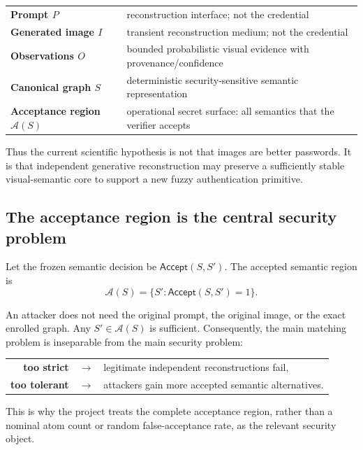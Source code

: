 \documentclass[11pt,a4paper]{article}
\newcommand{\Aset}{\mathcal{A}}
\begin{document}
\begin{center}
\begin{tabularx}{0.92\textwidth}{>{\bfseries}l X}
Prompt $P$ & reconstruction interface; not the credential \\
Generated image $I$ & transient reconstruction medium; not the credential \\
Observations $O$ & bounded probabilistic visual evidence with provenance/confidence \\
Canonical graph $S$ & deterministic security-sensitive semantic representation \\
Acceptance region $\Aset(S)$ & operational secret surface: all semantics that the verifier accepts \\
\end{tabularx}
\end{center}

Thus the current scientific hypothesis is not that images are better passwords. It is that independent generative reconstruction may preserve a sufficiently stable visual-semantic core to support a new fuzzy authentication primitive.

\subsection{The acceptance region is the central security problem}

Let the frozen semantic decision be $\mathsf{Accept}(S,S')$. The accepted semantic region is
\begin{equation}
  \Aset(S)=\{S' : \mathsf{Accept}(S,S')=1\}.
\end{equation}

An attacker does not need the original prompt, the original image, or the exact enrolled graph. Any $S'\in\Aset(S)$ is sufficient. Consequently, the main matching problem is inseparable from the main security problem:

\begin{center}
\begin{tabular}{rcl}
\textbf{too strict} & $\longrightarrow$ & legitimate independent reconstructions fail,\\[0.3em]
\textbf{too tolerant} & $\longrightarrow$ & attackers gain more accepted semantic alternatives.
\end{tabular}
\end{center}

This is why the project treats the complete acceptance region, rather than a nominal atom count or random false-acceptance rate, as the relevant security object.
\end{document}
